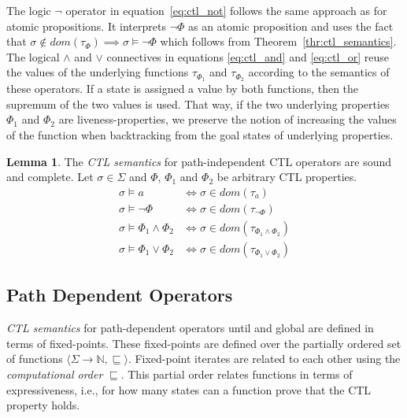 \documentclass[11pt,a4paper,titlepage]{article}
\theoremstyle{definition}
\newtheorem{lemma}[theorem]{Lemma}
\begin{document}
The logic $\neg$ operator in equation~\ref{eq:ctl_not} follows the same approach as for atomic propositions. 
It interprets $\neg \Phi$ as an atomic proposition and uses the fact that
$\sigma \notin dom(\tau_{\Phi}) \implies \sigma \models \neg \Phi$ which follows from Theorem~\ref{thr:ctl_semantics}.\\

The logical $\land$ and $\lor$ connectives in equations \ref{eq:ctl_and} and \ref{eq:ctl_or} reuse the values of the underlying functions $\tau_{\Phi_1}$ and
$\tau_{\Phi_2}$ according to the semantics of these operators. If a state is assigned a value by both functions, 
then the supremum of the two values is used. That way, if the two underlying properties $\Phi_1$ and $\Phi_2$ are liveness-properties,
we preserve the notion of increasing the values of the function when backtracking from the goal states of underlying properties.

\begin{lemma}\label{lem:ctl_semantics_path_independent}
    The \textit{CTL semantics} for path-independent CTL operators are sound and complete. 
    Let $\sigma \in \Sigma$ and $\Phi$, $\Phi_1$ and $\Phi_2$ be arbitrary CTL properties.
    \begin{align}
        \sigma \models a &\iff \sigma \in dom(\tau_{a})\\
        \sigma \models \neg \Phi &\iff \sigma \in dom(\tau_{\neg \Phi})\\
        \sigma \models \Phi_1 \land \Phi_2 &\iff \sigma \in dom(\tau_{\Phi_1 \land \Phi_2})\\
        \sigma \models \Phi_1 \lor \Phi_2 &\iff \sigma \in dom(\tau_{\Phi_1 \lor \Phi_2})
    \end{align}
\end{lemma}


\subsection{Path Dependent Operators}

\textit{CTL semantics} for path-dependent operators \textsf{until} and \textsf{global} are defined in terms of fixed-points. 
These fixed-points are defined over the partially ordered set of functions $\langle \Sigma \rightarrow \mathbb{N}, \sqsubseteq \rangle$. 
Fixed-point iterates are related to each other using the \textit{computational order} $\sqsubseteq$. 
This partial order relates functions in terms of expressiveness, i.e., for how many states can a function prove that the CTL property holds.
\end{document}
